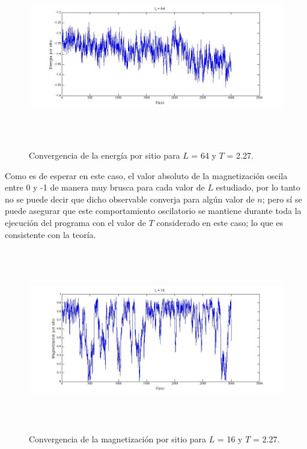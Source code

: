 \documentclass[a4paper,12pt]{article}
\begin{document}
\begin{figure}[H]
\begin{center}
\includegraphics[height=8cm]{../graficos/En_L64_T227.jpg}
\caption[width=5cm]{Convergencia de la energ\'ia por sitio para $L$ = 64 y $T$ = 2.27.}
\end{center}
\end{figure}


Como es de esperar en este caso, el valor absoluto de la magnetizaci\'on oscila entre 0 y -1 de manera muy brusca para cada valor de $L$ estudiado, por lo tanto no se puede decir que dicho observable converja para alg\'un valor de $n$; pero s\'i se puede asegurar que este comportamiento oscilatorio se mantiene durante toda la ejecuci\'on del programa con el valor de $T$ considerado en este caso; lo que es consistente con la teor\'ia.

\begin{figure}[H]
\begin{center}
\includegraphics[height=8cm]{../graficos/Mag_L16_T227.jpg}
\caption[width=5cm]{Convergencia de la magnetizaci\'on por sitio para $L$ = 16 y $T$ = 2.27.}
\end{center}
\end{figure}
\end{document}
